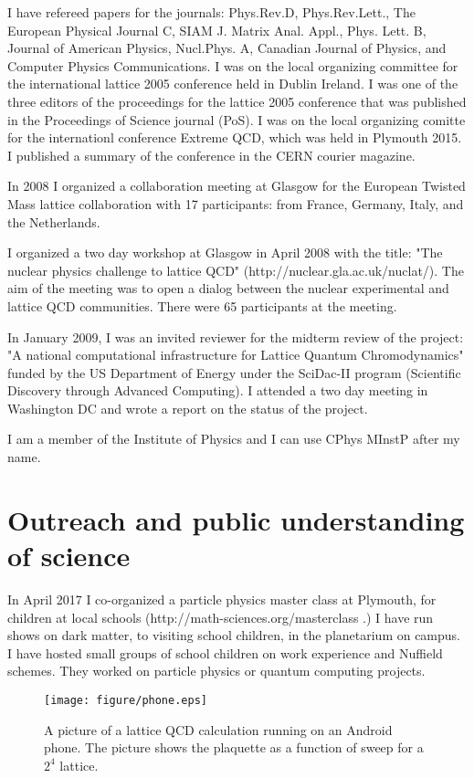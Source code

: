 \documentclass[12pt]{article}
\begin{document}
I have refereed papers for the journals: Phys.Rev.D, Phys.Rev.Lett.,
The European Physical Journal C, SIAM J. Matrix Anal. Appl.,
Phys. Lett. B, Journal of American Physics, Nucl.Phys. A, 
Canadian Journal of Physics,
and 
Computer Physics Communications.
I was on the local
organizing committee for the international lattice 2005 conference
held in Dublin Ireland. I was one of the three editors of the
proceedings for the lattice 2005 conference that was published in the
Proceedings of Science journal (PoS). I was on the local organizing
comitte for the internationl conference Extreme QCD, which was held
in Plymouth 2015. I published a summary of the conference in the CERN 
courier magazine.

In 2008 I organized a collaboration meeting at Glasgow for the
European Twisted Mass lattice collaboration with 17 participants: from
France, Germany, Italy, and the Netherlands.

I organized a two day workshop at Glasgow in April 2008 with the
title: "The nuclear physics challenge to lattice QCD"
(http://nuclear.gla.ac.uk/nuclat/). The aim of the meeting was to
open a dialog between the nuclear experimental and lattice
QCD communities. There were 65 participants at the meeting.

In January 2009, I was an invited reviewer for the midterm review of
the project: "A national computational infrastructure for Lattice
Quantum Chromodynamics" funded by the US Department of Energy 
under the SciDac-II program (Scientific Discovery 
through Advanced Computing).
I attended a two day meeting in Washington DC and wrote a report
on the status of the project.

I am a member of the Institute of Physics and I can use
CPhys MInstP after my name.

\section{Outreach and public understanding of science}

In April 2017 I co-organized a particle physics master 
class at Plymouth, for children at local schools  (http://math-sciences.org/masterclass .)
I have run shows on dark matter, to visiting school children,
in the planetarium on campus. I have hosted small groups
of school children on work experience and Nuffield 
schemes. They worked on particle physics or quantum computing
projects.

\begin{figure}
\begin{center}
\texttt{[image: figure/phone.eps]}
\end{center}
 \caption {
A picture of a lattice QCD calculation running on an
Android phone. The picture shows the plaquette as a function 
of sweep for a $2^4$ lattice.
 }
\label{fig:phone}
 \end{figure}
\end{document}
